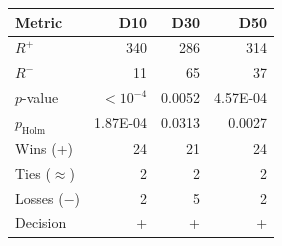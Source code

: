 \zebra
\begin{tabular}{lrrr}
\toprule
\textbf{Metric} & \textbf{D10} & \textbf{D30} & \textbf{D50} \\
\midrule
$R^+$ & 340 & 286 & 314 \\
$R^-$ & 11 & 65 & 37 \\
$p$-value & $<10^{-4}$ & 0.0052 & 4.57E-04 \\
$p_{\mathrm{Holm}}$ & 1.87E-04 & 0.0313 & 0.0027 \\
Wins (+) & 24 & 21 & 24 \\
Ties ($\approx$) & 2 & 2 & 2 \\
Losses ($-$) & 2 & 5 & 2 \\
Decision & + & + & + \\
\bottomrule
\end{tabular}
